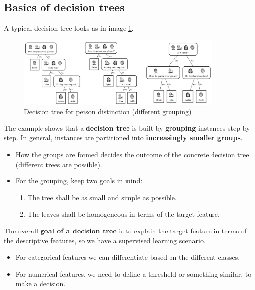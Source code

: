 \subsection{Basics of decision trees}

A typical decision tree looks as in image \ref{fig:3_tree_example}.

\begin{figure}[h]
  \centering
  \includegraphics[width=0.9\textwidth]{assets/trees/basics/tree_example_people.png}
  \caption{Decision tree for person distinction (different grouping)}
  \label{fig:3_tree_example}
\end{figure}

The example shows that a \textbf{decision tree} is built by \textbf{grouping} instances step by step. In general, instances are partitioned into \textbf{increasingly smaller groups}. 
\begin{itemize}
  \item How the groups are formed decides the outcome of the concrete decision tree (different trees are possible).
  \item For the grouping, keep two goals in mind:
  \begin{enumerate}
    \item The tree shall be as small and simple as possible.
    \item The leaves shall be homogeneous in terms of the target feature.
  \end{enumerate}
\end{itemize}

The overall \textbf{goal of a decision tree} is to explain the target feature in terms of the descriptive features, so we have a supervised learning scenario.
\begin{itemize}
  \item For categorical features we can differentiate based on the different classes.
  \item For numerical features, we need to define a threshold or something similar, to make a decision.
\end{itemize}

